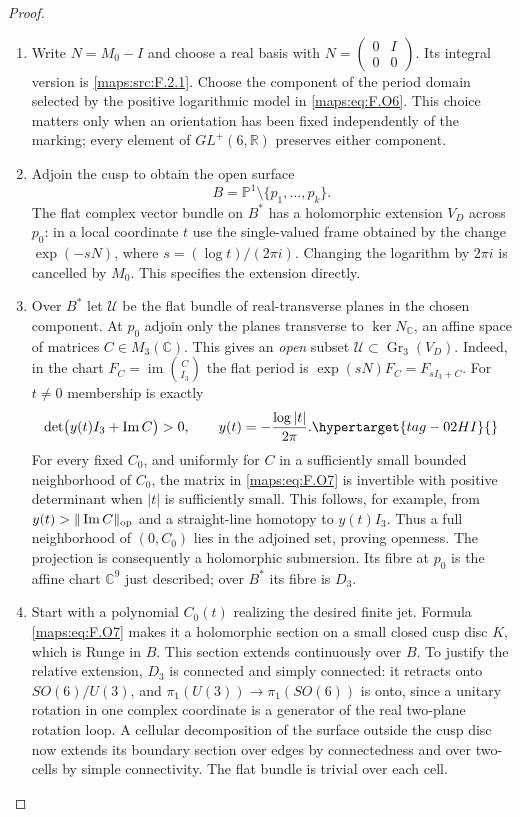 \documentclass[11pt,a4paper]{article}
\numberwithin{equation}{section}
\theoremstyle{definition}
\begin{document}
\begin{proof}
\begin{enumerate}[label=\arabic*.]
\item Write $N=M_0-I$ and choose a real basis with
$N=\left(\begin{smallmatrix}0&I\\0&0\end{smallmatrix}\right)$.
Its integral version is \cref{maps:src:F.2.1}.  Choose the component
of the period domain selected by the positive logarithmic
model in \eqref{maps:eq:F.O6}.  This choice matters only when an orientation
has been fixed independently of the marking; every element
of $GL^+(6,\mathbb R)$ preserves either component.

\item Adjoin the cusp to obtain the open surface
\[
 B=\mathbb P^1\setminus\{p_1,\ldots,p_k\}.
\]
The flat complex vector bundle on $B^*$ has a holomorphic
extension $V_D$ across $p_0$: in a local coordinate $t$ use
the single-valued frame obtained by the change
$\exp(-sN)$, where $s=(\log t)/(2\pi i)$.
Changing the logarithm by $2\pi i$ is cancelled by $M_0$.
This specifies the extension directly.

\item Over $B^*$ let $\mathscr U$ be the flat bundle of real-transverse
planes in the chosen component.  At $p_0$ adjoin only the
planes transverse to $\ker N_\mathbb C$, an affine space of
matrices $C\in M_3(\mathbb C)$.  This gives an \emph{open}
subset $\mathscr U\subset\operatorname{Gr}_3(V_D)$.
Indeed, in the chart $F_C=\operatorname{im}\binom C{I_3}$
the flat period is
$\exp(sN)F_C=F_{sI_3+C}$.  For $t\ne0$ membership is exactly
\begin{equation}
 \det\bigl(y(t)I_3+\operatorname{Im}C\bigr)>0,
 \qquad y(t)=-\frac{\log|t|}{2\pi}.
 \hypertarget{tag-02HI}{}\label{maps:eq:F.O7}
\end{equation}
For every fixed $C_0$, and uniformly for $C$ in a sufficiently
small bounded neighborhood of $C_0$, the matrix in \eqref{maps:eq:F.O7} is
invertible with positive determinant when $|t|$ is sufficiently
small.  This follows, for example, from
$y(t)>\|\operatorname{Im}C\|_{\rm op}$ and a straight-line
homotopy to $y(t)I_3$.  Thus a full neighborhood of
$(0,C_0)$ lies in the adjoined set, proving openness.
The projection is consequently a holomorphic submersion. Its fibre
at $p_0$ is the affine chart $\mathbb C^9$ just described; over
$B^*$ its fibre is $D_3$.

\item Start with a polynomial $C_0(t)$ realizing the desired finite
jet.  Formula \eqref{maps:eq:F.O7} makes it a holomorphic section on a small
closed cusp disc $K$, which is Runge in $B$.
This section extends continuously over $B$.  To justify the
relative extension, $D_3$ is connected and simply connected:
it retracts onto $SO(6)/U(3)$, and
$\pi_1(U(3))\to\pi_1(SO(6))$ is onto, since a unitary rotation
in one complex coordinate is a generator of the real
two-plane rotation loop.  A cellular decomposition of the
surface outside the cusp disc now extends its boundary
section over edges by connectedness and over two-cells by
simple connectivity.  The flat bundle is trivial over each cell.


\end{enumerate}
\end{proof}
\end{document}

